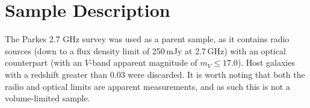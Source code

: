 \documentclass[fleqn,usenatbib,useAMS]{mnras}
\begin{document}


\section{Sample Description}
	\label{sec:samp}
	The Parkes 2.7 GHz survey \citep{Ekers1989} was used as a parent sample, as it contains radio sources (down to a flux density limit of 250\,mJy at 2.7\,GHz) with an optical counterpart (with an $V$-band apparent magnitude of $m_V \le 17.0$). Host galaxies with a redshift greater than 0.03 were discarded. It is worth noting that both the radio and optical limits are apparent measurements, and as such this is not a volume-limited sample.
\end{document}
